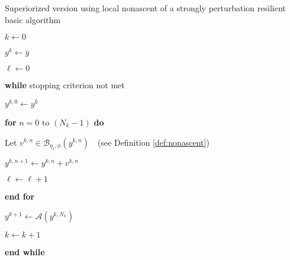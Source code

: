 \documentclass[smallextended]{svjour3}      %
\begin{document}
\begin{algorithm}
	\caption{Superiorized version using local nonascent of a strongly perturbation resilient basic algorithm \label{alg: sup-version}}
	\normalsize
		$k\leftarrow0$
		\label{step: k=00003D0} \par
		$y^{k}\leftarrow\bar{y}$
		\label{step: y0}\par
		$\ell\leftarrow0$
		\label{step: L0} \par
		\textbf{while }stopping criterion not met
		\label{step: lp_st}\par
		\hspace{0.75cm}$y^{k,0}\leftarrow y^{k}$
		\label{step: yk1} \par
		\hspace{0.75cm}\textbf{for} $n=0\mbox{ to }(N_{k}-1)$ \textbf{do}
		\label{step: for_st}\par
		\hspace{1.5cm}
		Let $v^{k,n}\in\mathcal{B}_{\eta_{\ell},\phi}(y^{k,n})$
		$\ \ \ $(see Definition \ref{def:nonascent})
		\label{step: pick_v}\par
		\hspace{1.5cm}
		$y^{k,n+1}\leftarrow y^{k,n}+v^{k,n}$
		\label{step:8}\par
		\hspace{1.5cm}
		$\ell\leftarrow\ell+1$
		\label{step: L++}\par
		\hspace{0.75cm}
		\textbf{end for}
		\label{step: for_end} \par
		\hspace{0.75cm}
		$y^{k+1}\leftarrow\mathcal{A}\left(y^{k,N_{k}}\right)$
		\label{step: A}	\par
		\hspace{0.75cm}
		$k\leftarrow k+1$
		\par
		\textbf{end while}
		\label{step: lp_end}\par
	\bigskip
\end{algorithm}
\end{document}
